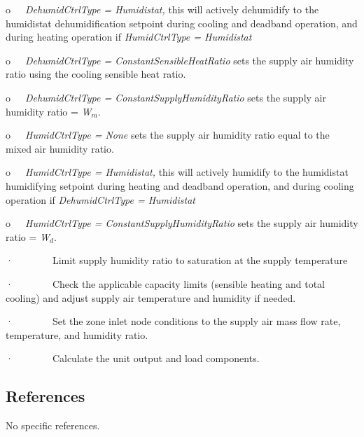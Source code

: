 o~~~\emph{DehumidCtrlType = Humidistat,} this will actively dehumidify to the humidistat dehumidification setpoint during cooling and deadband operation, and during heating operation if \emph{HumidCtrlType = Humidistat}

o~~~\emph{DehumidCtrlType = ConstantSensibleHeatRatio} sets the supply air humidity ratio using the cooling sensible heat ratio.

o~~~\emph{DehumidCtrlType = ConstantSupplyHumidityRatio} sets the supply air humidity ratio = \emph{W\(_{m}\)}.

o~~~\emph{HumidCtrlType = None} sets the supply air humidity ratio equal to the mixed air humidity ratio.

o~~~\emph{HumidCtrlType = Humidistat,} this will actively humidify to the humidistat humidifying setpoint during heating and deadband operation, and during cooling operation if \emph{DehumidCtrlType = Humidistat}

o~~~\emph{HumidCtrlType = ConstantSupplyHumidityRatio} sets the supply air humidity ratio = \emph{W\(_{d}\)}.

·~~~~~~~~Limit supply humidity ratio to saturation at the supply temperature

·~~~~~~~~Check the applicable capacity limits (sensible heating and total cooling) and adjust supply air temperature and humidity if needed.

·~~~~~~~~Set the zone inlet node conditions to the supply air mass flow rate, temperature, and humidity ratio.

·~~~~~~~~Calculate the unit output and load components.

\subsection{References}\label{references-029}

No specific references.
